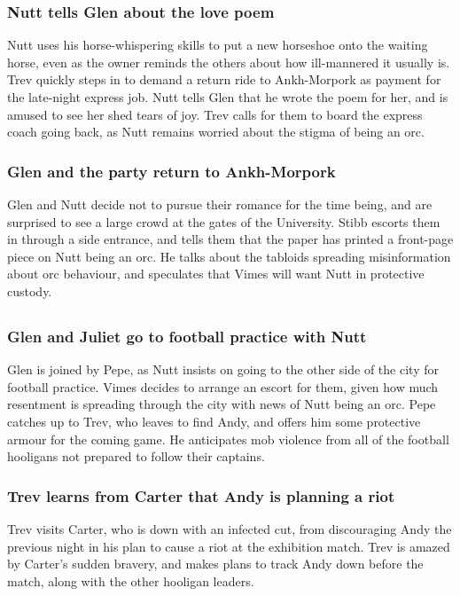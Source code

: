 \subsubsection{\Gls{Nutt} tells \Gls{Glen} about the love poem}
\Gls{Nutt} uses his horse-whispering skills to put a new horseshoe onto the waiting horse, even as
the owner reminds the others about how ill-mannered it usually is. \Gls{Trev} quickly steps in to
demand a return ride to Ankh-Morpork as payment for the late-night express job. \Gls{Nutt} tells
\Gls{Glen} that he wrote the poem for her, and is amused to see her shed tears of joy. \Gls{Trev}
calls for them to board the express coach going back, as \Gls{Nutt} remains worried about the stigma
of being an orc.

\subsubsection{\Gls{Glen} and the party return to Ankh-Morpork}
\Gls{Glen} and \Gls{Nutt} decide not to pursue their romance for the time being, and are surprised
to see a large crowd at the gates of the University. \Gls{Stibb} escorts them in through a side
entrance, and tells them that the paper has printed a front-page piece on \Gls{Nutt} being an orc.
He talks about the tabloids spreading misinformation about orc behaviour, and speculates that
\Gls{Vimes} will want \Gls{Nutt} in protective custody.

\subsection{}
\subsubsection{\Gls{Glen} and \Gls{Juliet} go to football practice with \Gls{Nutt}}
\Gls{Glen} is joined by \Gls{Pepe}, as \Gls{Nutt} insists on going to the other side of the city
for football practice. \Gls{Vimes} decides to arrange an escort for them, given how much resentment
is spreading through the city with news of \Gls{Nutt} being an orc. \Gls{Pepe} catches up to
\Gls{Trev}, who leaves to find \Gls{Andy}, and offers him some protective armour for the coming
game. He anticipates mob violence from all of the football hooligans not prepared to follow their
captains.

\subsubsection{\Gls{Trev} learns from \Gls{Carter} that \Gls{Andy} is planning a riot}
\Gls{Trev} visits \Gls{Carter}, who is down with an infected cut, from discouraging \Gls{Andy} the
previous night in his plan to cause a riot at the exhibition match. \Gls{Trev} is amazed by
\Gls{Carter}'s sudden bravery, and makes plans to track \Gls{Andy} down before the match, along with
the other hooligan leaders.

